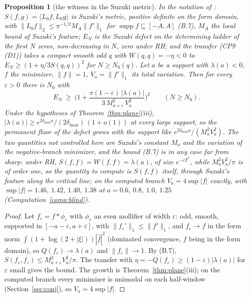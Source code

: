 \documentclass[11pt]{article}
\newtheorem{proposition}[theorem]{Proposition}
\theoremstyle{definition}
\theoremstyle{remark}
\newcommand{\Tst}{T^{*}}
\begin{document}
\begin{proposition}[the witness in the Suzuki metric]\label{prop:suzuki}
In the notation of \cite[Appendix~B and CP9, \S B]{michaels-atlas}: $S(f,g)=\langle L_0f,L_0g\rangle$ is Suzuki's metric, positive definite on the form domain, with $\|L_0f\|_2\le\pi^{-1/2}M_A\|f'\|_1$ for $\operatorname{supp}f\subseteq[-A,A]$ (B.7), $M_A$ the local bound of Suzuki's feature; $E_N$ is the Suzuki defect on the determining ladder of the first $N$ zeros, non-decreasing in $N$, zero under RH; and the transfer (CP9 (D1)) takes a compact smooth odd $q$ with $W(q,q)=-\eta<0$ to $E_N\ge(1+\eta/3S(q,q))^2$ for $N\ge N_0(q)$. Let $a$ be a support with $\lambda(a)<0$, $f$ the minimizer, $\|f\|=1$, $V_a=\|f'\|_1$ its total variation. Then for every $\varepsilon>0$ there is $N_0$ with
\[
E_N\ \ge\ \Big(1+\frac{\pi(1-\varepsilon)\,|\lambda(a)|}{3\,M_{a+\varepsilon}^2\,V_a^2}\Big)^2\qquad(N\ge N_0).
\]
Under the hypotheses of Theorem~\ref{thm:plane}(iii), $|\lambda(a)|\ge e^{2\delta_{\max}a}/(2\delta_{\max})\,(1+o(1))$ at every large support, so the permanent floor of the defect grows with the support like $e^{2\delta_{\max}a}/(M_a^2V_a^2)$. The two quantities not controlled here are Suzuki's constant $M_a$ and the variation of the negative-branch minimizer, and the bound (B.7) is in any case far from sharp: under RH, $S(f,f)=W(f,f)=\lambda(a)$, of size $e^{-c\Tst}$, while $M_a^2V_a^2/\pi$ is of order one, so the quantity to compute is $S(f,f)$ itself, through Suzuki's feature along the critical line; on the computed branch $V_a=4\sup|f|$ exactly, with $\sup|f|=1.46$, $1.42$, $1.40$, $1.38$ at $a=0.6$, $0.8$, $1.0$, $1.25$ (Computation~\ref{comp:blind}).
\end{proposition}
\begin{proof}
Let $f_\varepsilon=f*\phi_\varepsilon$ with $\phi_\varepsilon$ an even mollifier of width $\varepsilon$: odd, smooth, supported in $[-a-\varepsilon,a+\varepsilon]$, with $\|f_\varepsilon'\|_1\le\|f'\|_1$, and $f_\varepsilon\to f$ in the form norm $\int(1+\log(2+|\xi|))|\hat f|^2$ (dominated convergence, $f$ being in the form domain), so $Q(f_\varepsilon)\to\lambda(a)$ and $\|f_\varepsilon\|\to1$. By (B.7), $S(f_\varepsilon,f_\varepsilon)\le M_{a+\varepsilon}^2V_a^2/\pi$. The transfer with $\eta=-Q(f_\varepsilon)\ge(1-\varepsilon)|\lambda(a)|$ for $\varepsilon$ small gives the bound. The growth is Theorem~\ref{thm:plane}(iii); on the computed branch every minimizer is unimodal on each half-window (Section~\ref{sec:conj}), so $V_a=4\sup|f|$.
\end{proof}
\end{document}
